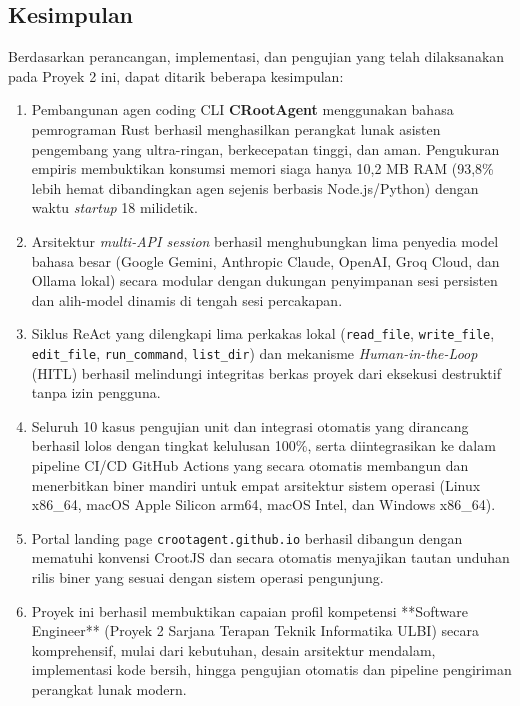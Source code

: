 \subsection{Kesimpulan}
Berdasarkan perancangan, implementasi, dan pengujian yang telah dilaksanakan pada Proyek 2 ini, dapat ditarik beberapa kesimpulan:
\begin{enumerate}
    \item Pembangunan agen coding CLI \textbf{CRootAgent} menggunakan bahasa pemrograman Rust berhasil menghasilkan perangkat lunak asisten pengembang yang ultra-ringan, berkecepatan tinggi, dan aman. Pengukuran empiris membuktikan konsumsi memori siaga hanya 10,2 MB RAM (93,8\% lebih hemat dibandingkan agen sejenis berbasis Node.js/Python) dengan waktu \textit{startup} 18 milidetik.
    \item Arsitektur \textit{multi-API session} berhasil menghubungkan lima penyedia model bahasa besar (Google Gemini, Anthropic Claude, OpenAI, Groq Cloud, dan Ollama lokal) secara modular dengan dukungan penyimpanan sesi persisten dan alih-model dinamis di tengah sesi percakapan.
    \item Siklus ReAct yang dilengkapi lima perkakas lokal (\texttt{read\_file}, \texttt{write\_file}, \texttt{edit\_file}, \texttt{run\_command}, \texttt{list\_dir}) dan mekanisme \textit{Human-in-the-Loop} (HITL) berhasil melindungi integritas berkas proyek dari eksekusi destruktif tanpa izin pengguna.
    \item Seluruh 10 kasus pengujian unit dan integrasi otomatis yang dirancang berhasil lolos dengan tingkat kelulusan 100\%, serta diintegrasikan ke dalam pipeline CI/CD GitHub Actions yang secara otomatis membangun dan menerbitkan biner mandiri untuk empat arsitektur sistem operasi (Linux x86\_64, macOS Apple Silicon arm64, macOS Intel, dan Windows x86\_64).
    \item Portal landing page \texttt{crootagent.github.io} berhasil dibangun dengan mematuhi konvensi CrootJS dan secara otomatis menyajikan tautan unduhan rilis biner yang sesuai dengan sistem operasi pengunjung.
    \item Proyek ini berhasil membuktikan capaian profil kompetensi **Software Engineer** (Proyek 2 Sarjana Terapan Teknik Informatika ULBI) secara komprehensif, mulai dari kebutuhan, desain arsitektur mendalam, implementasi kode bersih, hingga pengujian otomatis dan pipeline pengiriman perangkat lunak modern.
\end{enumerate}


